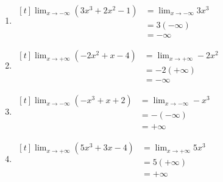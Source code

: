 \documentclass[12pt,a4paper]{article}
\begin{document}
\begin{enumerate}
    \item 
    $\begin{aligned}[t]
        \lim_{x \to -\infty} (3x^3 + 2x^2 - 1) &= \lim_{x \to -\infty} 3x^3 \\
        &= 3(-\infty) \\
        &= -\infty
    \end{aligned}$
    
    \vspace{0.2cm}

    \vspace{0.6cm}

    \item 
    $\begin{aligned}[t]
        \lim_{x \to +\infty} (-2x^2 + x - 4) &= \lim_{x \to +\infty} -2x^2 \\
        &= -2(+\infty) \\
        &= -\infty
    \end{aligned}$
    
    \vspace{0.2cm}

    \vspace{0.6cm}

    \item 
    $\begin{aligned}[t]
        \lim_{x \to -\infty} (-x^3 + x + 2) &= \lim_{x \to -\infty} -x^3 \\
        &= -(-\infty) \\
        &= +\infty
    \end{aligned}$
    
    \vspace{0.2cm}

    \vspace{0.6cm}

    \item 
    $\begin{aligned}[t]
        \lim_{x \to +\infty} (5x^3 + 3x - 4) &= \lim_{x \to +\infty} 5x^3 \\
        &= 5(+\infty) \\
        &= +\infty
    \end{aligned}$
    
    \vspace{0.2cm}
\end{enumerate}
\end{document}
